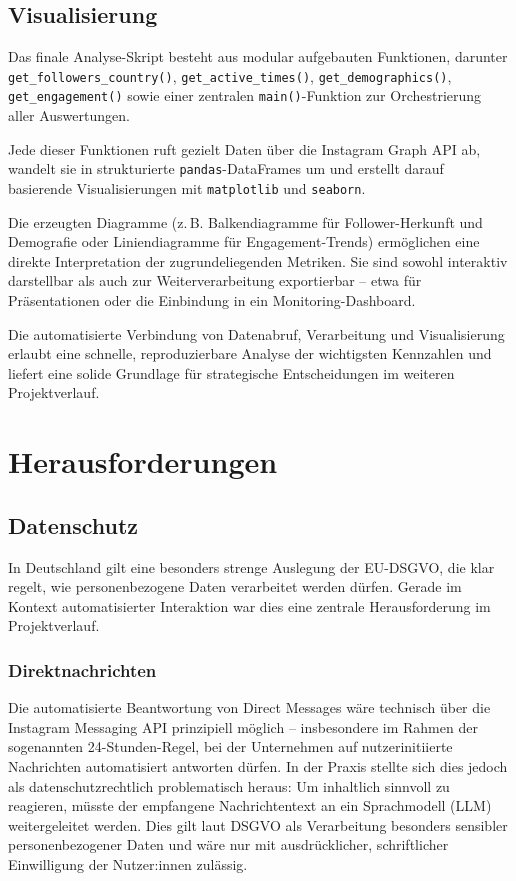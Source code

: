\documentclass[a4paper,12pt]{article}
\begin{document}
\subsection{Visualisierung}

Das finale Analyse-Skript besteht aus modular aufgebauten Funktionen, darunter \texttt{get\_followers\_country()}, \texttt{get\_active\_times()}, \texttt{get\_demographics()}, \texttt{get\_engagement()} sowie einer zentralen \texttt{main()}-Funktion zur Orchestrierung aller Auswertungen.

Jede dieser Funktionen ruft gezielt Daten über die Instagram Graph API ab, wandelt sie in strukturierte \texttt{pandas}-DataFrames um und erstellt darauf basierende Visualisierungen mit \texttt{matplotlib} und \texttt{seaborn}.

Die erzeugten Diagramme (z.\,B. Balkendiagramme für Follower-Herkunft und Demografie oder Liniendiagramme für Engagement-Trends) ermöglichen eine direkte Interpretation der zugrundeliegenden Metriken. Sie sind sowohl interaktiv darstellbar als auch zur Weiterverarbeitung exportierbar – etwa für Präsentationen oder die Einbindung in ein Monitoring-Dashboard.

Die automatisierte Verbindung von Datenabruf, Verarbeitung und Visualisierung erlaubt eine schnelle, reproduzierbare Analyse der wichtigsten Kennzahlen und liefert eine solide Grundlage für strategische Entscheidungen im weiteren Projektverlauf.


\section{Herausforderungen}
\subsection{Datenschutz}

In Deutschland gilt eine besonders strenge Auslegung der EU-DSGVO, die klar regelt, wie personenbezogene Daten verarbeitet werden dürfen. Gerade im Kontext automatisierter Interaktion war dies eine zentrale Herausforderung im Projektverlauf.

\subsubsection*{Direktnachrichten}
Die automatisierte Beantwortung von Direct Messages wäre technisch über die Instagram Messaging API prinzipiell möglich – insbesondere im Rahmen der sogenannten 24-Stunden-Regel, bei der Unternehmen auf nutzerinitiierte Nachrichten automatisiert antworten dürfen. In der Praxis stellte sich dies jedoch als datenschutzrechtlich problematisch heraus: Um inhaltlich sinnvoll zu reagieren, müsste der empfangene Nachrichtentext an ein Sprachmodell (LLM) weitergeleitet werden. Dies gilt laut DSGVO als Verarbeitung besonders sensibler personenbezogener Daten und wäre nur mit ausdrücklicher, schriftlicher Einwilligung der Nutzer:innen zulässig.
\end{document}
